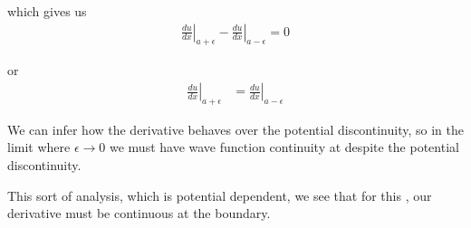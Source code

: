 {which gives us
%
\begin{equation}\label{eqn:PHY356Lecture9:22}
\begin{aligned}
\left.\frac{du}{dx}\right\vert_{a + \epsilon}
-\left.\frac{du}{dx}\right\vert_{a - \epsilon} = 0
\end{aligned}
\end{equation}

or
\begin{equation}\label{eqn:PHY356Lecture9:23}
\begin{aligned}
\left.\frac{du}{dx}\right\vert_{a + \epsilon}
&=
\left.\frac{du}{dx}\right\vert_{a - \epsilon}
\end{aligned}
\end{equation}

We can infer how the derivative behaves over the potential discontinuity, so in the limit where \(\epsilon \rightarrow 0\) we must have wave function continuity at despite the potential discontinuity.

This sort of analysis, which is potential dependent, we see that for this , our derivative must be continuous at the boundary.

} %

